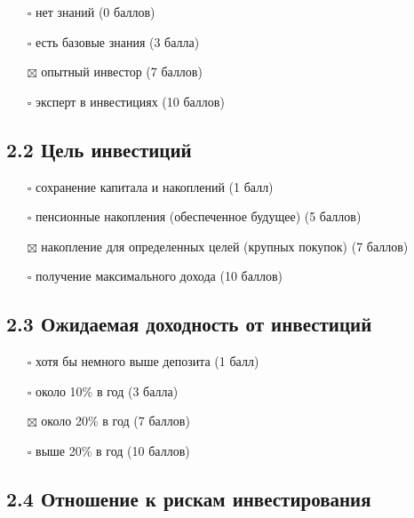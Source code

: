 \documentclass[11pt]{article}
\providecommand{\tightlist}{%
      \setlength{\itemsep}{0pt}\setlength{\parskip}{0pt}}
\begin{document}
\begin{itemize}
\tightlist
\item[$\square$]
  нет знаний (0 баллов)
\item[$\square$]
  есть базовые знания (3 балла)
\item[$\boxtimes$]
  опытный инвестор (7 баллов)
\item[$\square$]
  эксперт в инвестициях (10 баллов)
\end{itemize}

\subsection{2.2 Цель
инвестиций}\label{ux446ux435ux43bux44c-ux438ux43dux432ux435ux441ux442ux438ux446ux438ux439}

\begin{itemize}
\tightlist
\item[$\square$]
  сохранение капитала и накоплений (1 балл)
\item[$\square$]
  пенсионные накопления (обеспеченное будущее) (5 баллов)
\item[$\boxtimes$]
  накопление для определенных целей (крупных покупок) (7 баллов)
\item[$\square$]
  получение максимального дохода (10 баллов)
\end{itemize}

\subsection{2.3 Ожидаемая доходность от
инвестиций}\label{ux43eux436ux438ux434ux430ux435ux43cux430ux44f-ux434ux43eux445ux43eux434ux43dux43eux441ux442ux44c-ux43eux442-ux438ux43dux432ux435ux441ux442ux438ux446ux438ux439}

\begin{itemize}
\tightlist
\item[$\square$]
  хотя бы немного выше депозита (1 балл)
\item[$\square$]
  около 10\% в год (3 балла)
\item[$\boxtimes$]
  около 20\% в год (7 баллов)
\item[$\square$]
  выше 20\% в год (10 баллов)
\end{itemize}

\subsection{2.4 Отношение к рискам
инвестирования}\label{ux43eux442ux43dux43eux448ux435ux43dux438ux435-ux43a-ux440ux438ux441ux43aux430ux43c-ux438ux43dux432ux435ux441ux442ux438ux440ux43eux432ux430ux43dux438ux44f}
\end{document}
